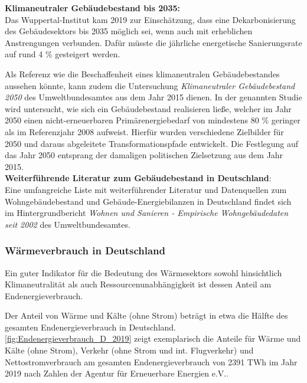 				\textbf{Klimaneutraler Gebäudebestand bis 2035:}\\
				Das Wuppertal-Institut kam 2019 zur Einschätzung, dass eine Dekarbonisierung des Gebäudesektors bis 2035 möglich sei, wenn auch mit erheblichen Anstrengungen verbunden. Dafür müsste die jährliche energetische Sanierungsrate auf rund 4 \% gesteigert werden. \cite[S.~95]{Wuppertal_Institut_CO2_neutral_2035}
				
				Als Referenz wie die Beschaffenheit eines klimaneutralen Gebäudebestandes aussehen könnte, kann zudem die Untersuchung \textit{Klimaneutraler Gebäudebestand 2050} des Umweltbundesamtes aus dem Jahr 2015 dienen. In der genannten Studie wird untersucht, wie sich ein Gebäudebestand realisieren ließe, welcher im Jahr 2050 einen nicht-erneuerbaren Primärenergiebedarf von mindestens 80 \% geringer als im Referenzjahr 2008 aufweist. Hierfür wurden verschiedene Zielbilder für 2050 und daraus abgeleitete Transformationspfade entwickelt. Die Festlegung auf das Jahr 2050 entsprang der damaligen politischen Zielsetzung aus dem Jahr 2015. \cite{Umweltbundesamt_Klimaneutraler_Gebäudebestand_2050}\\
								
				\textbf{Weiterführende Literatur zum Gebäudebestand in Deutschland}:\\
				Eine umfangreiche Liste mit weiterführender Literatur und Datenquellen zum Wohngebäudebestand und Gebäude-Energiebilanzen in Deutschland findet sich im Hintergrundbericht \textit{Wohnen und Sanieren - Empirische Wohngebäudedaten seit 2002} des Umweltbundesamtes. \cite[S.~59ff]{Umweltbundesamt_Wohnen_und_Sanieren_2019}
						
			\subsubsection{Wärmeverbrauch in Deutschland}
			
				Ein guter Indikator für die Bedeutung des Wärmesektors sowohl hinsichtlich Klimaneutralität als auch Ressourcenunabhängigkeit ist dessen Anteil am Endenergieverbrauch.

				Der Anteil von Wärme und Kälte (ohne Strom) beträgt in etwa die Hälfte des gesamten Endenergieverbrauch in Deutschland. \autoref{fig:Endenergieverbrauch_D_2019} zeigt exemplarisch die Anteile für Wärme und Kälte (ohne Strom), Verkehr (ohne Strom und int. Flugverkehr) und Nettostromverbrauch am gesamten Endenergieverbrauch von 2391 TWh im Jahr 2019 nach Zahlen der Agentur für Erneuerbare Energien e.V.. \cite{AEE_abb_Endenergieverbrauch_D_2019_Strom_Wärme_Verkehr} 
				
